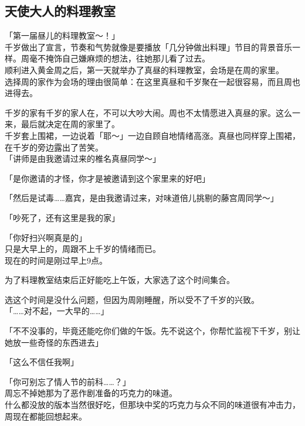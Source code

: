 \subsection{天使大人的料理教室}

「第一届昼儿的料理教室～！」\\

千岁做出了宣言，节奏和气势就像是要播放「几分钟做出料理」节目的背景音乐一样。周毫不掩饰自己嫌麻烦的想法，往她那儿看了过去。\\

顺利进入黄金周之后，第一天就举办了真昼的料理教室，会场是在周的家里。\\

选择周的家作为会场的理由很简单：在这里真昼和千岁聚在一起很容易，而且周也进得去。

千岁的家有千岁的家人在，不可以大吵大闹。周也不太情愿进入真昼的家。这么一来，最后就决定在周的家里了。\\

千岁套上围裙，一边说着「耶～」一边自顾自地情绪高涨。真昼也同样穿上围裙，在千岁的旁边露出了苦笑。\\

「讲师是由我邀请过来的椎名真昼同学～」

「是你邀请的才怪，你才是被邀请到这个家里来的好吧」

「然后是试毒……嘉宾，是由我邀请过来，对味道倍儿挑剔的藤宫周同学～」

「吵死了，还有这里是我的家」

「你好扫兴啊真是的」\\

只是大早上的，周跟不上千岁的情绪而已。\\

现在的时间是刚过早上9点。

为了料理教室结束后正好能吃上午饭，大家选了这个时间集合。

选这个时间是没什么问题，但因为周刚睡醒，所以受不了千岁的兴致。\\

「……对不起，一大早的……」

「不不没事的，毕竟还能吃你们做的午饭。先不说这个，你帮忙监视下千岁，别让她放一些奇怪的东西进去」

「这么不信任我啊」

「你可别忘了情人节的前科……？」\\

周忘不掉她那为了恶作剧准备的巧克力的味道。\\

什么都没放的版本当然很好吃，但那块中奖的巧克力与众不同的味道很有冲击力，周现在都能回想起来。

